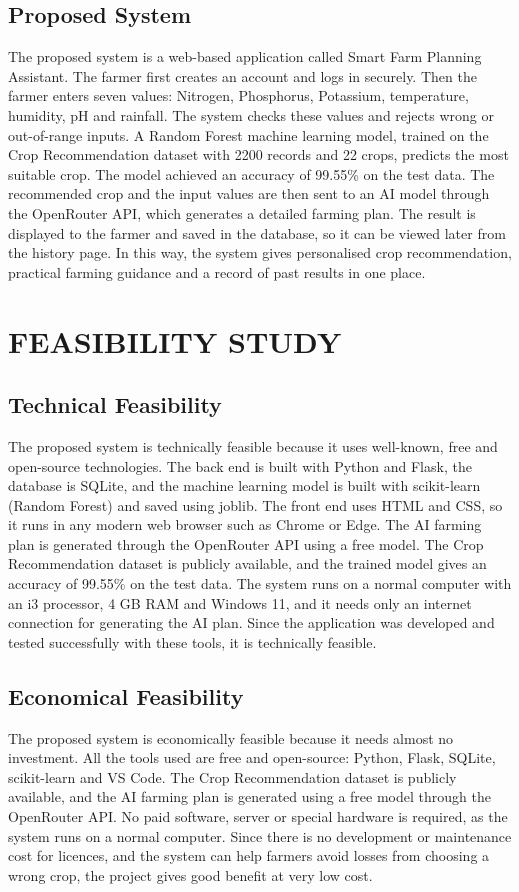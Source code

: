 \section{Proposed System}
The proposed system is a web-based application called Smart Farm Planning Assistant. The farmer first creates an account and logs in securely. Then the farmer enters seven values: Nitrogen, Phosphorus, Potassium, temperature, humidity, pH and rainfall. The system checks these values and rejects wrong or out-of-range inputs. A Random Forest machine learning model, trained on the Crop Recommendation dataset with 2200 records and 22 crops, predicts the most suitable crop. The model achieved an accuracy of 99.55\% on the test data. The recommended crop and the input values are then sent to an AI model through the OpenRouter API, which generates a detailed farming plan. The result is displayed to the farmer and saved in the database, so it can be viewed later from the history page. In this way, the system gives personalised crop recommendation, practical farming guidance and a record of past results in one place.
%
%
%
%
\chapter{FEASIBILITY STUDY}
%
\section{Technical Feasibility}
The proposed system is technically feasible because it uses well-known, free and open-source technologies. The back end is built with Python and Flask, the database is SQLite, and the machine learning model is built with scikit-learn (Random Forest) and saved using joblib. The front end uses HTML and CSS, so it runs in any modern web browser such as Chrome or Edge. The AI farming plan is generated through the OpenRouter API using a free model. The Crop Recommendation dataset is publicly available, and the trained model gives an accuracy of 99.55\% on the test data. The system runs on a normal computer with an i3 processor, 4 GB RAM and Windows 11, and it needs only an internet connection for generating the AI plan. Since the application was developed and tested successfully with these tools, it is technically feasible.
%
\section{Economical Feasibility}
The proposed system is economically feasible because it needs almost no investment. All the tools used are free and open-source: Python, Flask, SQLite, scikit-learn and VS Code. The Crop Recommendation dataset is publicly available, and the AI farming plan is generated using a free model through the OpenRouter API. No paid software, server or special hardware is required, as the system runs on a normal computer. Since there is no development or maintenance cost for licences, and the system can help farmers avoid losses from choosing a wrong crop, the project gives good benefit at very low cost.
%

